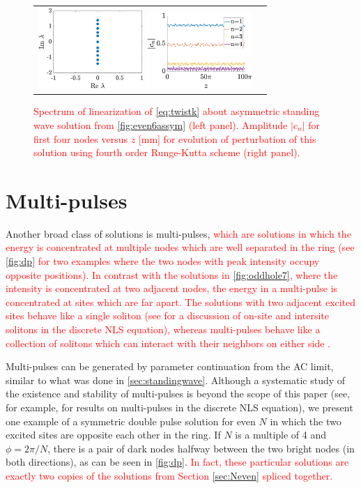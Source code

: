 \documentclass[reprint, amsmath,amssymb,aps,pra]{revtex4-2}
\renewcommand{\revised}[1]{ \textcolor{red}{#1} }
\begin{document}
\begin{figure}
    \begin{center}
    \begin{tabular}{cc}
    \includegraphics[width=4cm]{even6assymspec.eps}
    \includegraphics[width=4cm]{assym6pert.eps}
    \end{tabular}
    \end{center}
    \caption{\revised{Spectrum of linearization of \cref{eq:twistk} about asymmetric standing wave solution from \cref{fig:even6assym} (left panel). Amplitude $|c_n|$ for first four nodes versus $z$ [mm] for evolution of perturbation of this solution using fourth order Runge-Kutta scheme (right panel).}}
    \label{fig:assymstab}
    \end{figure}

\section{Multi-pulses}

Another broad class of solutions is multi-pulses, \revised{which are solutions in which the energy is concentrated at multiple nodes which are well separated in the ring (see \cref{fig:dp} for two examples where the two nodes with peak intensity occupy opposite positions). In contrast with the solutions in \cref{fig:oddhole7}, where the intensity is concentrated at two adjacent nodes, the energy in a multi-pulse is concentrated at sites which are far apart. The solutions with two adjacent excited sites behave like a single soliton (see \cite{Kevrekidis2009} for a discussion of on-site and intersite solitons in the discrete NLS equation), whereas multi-pulses behave like a collection of solitons which can interact with their neighbors on either side \cite{Parker2020}.}

Multi-pulses can be generated by parameter continuation from the AC limit, similar to what was done in \cref{sec:standingwave}. Although a systematic study of the existence and stability of multi-pulses is beyond the scope of this paper (see, for example, \cite{Parker2020} for results on multi-pulses in the discrete NLS equation), we present one example of a symmetric double pulse solution for even $N$ in which the two excited sites are opposite each other in the ring. If $N$ is a multiple of 4 and $\phi = 2\pi/N$, there is a pair of dark nodes halfway between the two bright nodes (in both directions), as can be seen in \cref{fig:dp}. \revised{In fact, these particular solutions are exactly two copies of the solutions from Section \ref{sec:Neven} spliced together.} 
\end{document}
